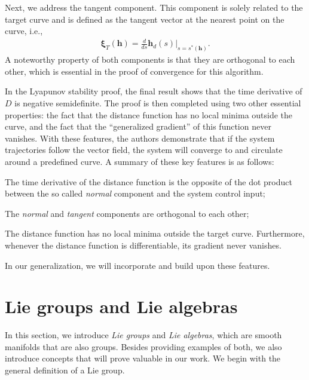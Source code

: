 Next, we address the tangent component. This component is solely related to the target curve and is defined as the tangent vector at the nearest point on the curve, i.e.,
\begin{align}
    \boldsymbol{\xi}_{T}(\mathbf{h}) = \frac{d}{ds}\mathbf{h}_d(s)|_{s=s^*(\mathbf{h})}.
\end{align}
A noteworthy property of both components is that they are orthogonal to each other, which is essential in the proof of convergence for this algorithm.

In the Lyapunov stability proof, the final result shows that the time derivative of $D$ is negative semidefinite. The proof is then completed using two other essential properties: the fact that the distance function has no local minima outside the curve, and the fact that the ``generalized gradient'' of this function never vanishes. With these features, the authors demonstrate that if the system trajectories follow the vector field, the system will converge to and circulate around a predefined curve. A summary of these key features is as follows:
\begin{feature}
    \item The time derivative of the distance function is the opposite of the dot product between the so called \emph{normal} component and the system control input; \label{feat:adriano-time-derivative-lyapunov-normal-comp}
    \item The \emph{normal} and \emph{tangent} components are orthogonal to each other; \label{feat:adriano-orthogonality}
    \item The distance function has no local minima outside the target curve. Furthermore, whenever the distance function is differentiable, its gradient never vanishes. \label{feat:adriano-no-local-minima}
\end{feature}
In our generalization, we will incorporate and build upon these features.

\section{Lie groups and Lie algebras}
In this section, we introduce \emph{Lie groups} and \emph{Lie algebras}, which are smooth manifolds that are also groups. Besides providing examples of both, we also introduce concepts that will prove valuable in our work. We begin with the general definition of a Lie group.
